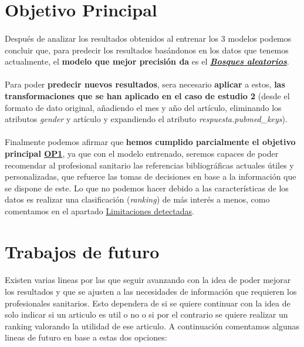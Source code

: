 \section{Objetivo Principal}

\paragraph{}
Después de analizar los resultados obtenidos al entrenar los 3 modelos podemos concluir que, para predecir los resultados basándonos en los datos que tenemos actualmente, el \textbf{modelo que mejor precisión da} es el \hyperref[table:comparative]{\textbf{\textit{Bosques aleatorios}}}.

\paragraph{}
Para poder \textbf{predecir nuevos resultados}, sera necesario \textbf{aplicar} a estos, \textbf{las transformaciones que se han aplicado en el caso de estudio 2} (desde el formato de dato original, añadiendo el mes y año del artículo, eliminando los atributos \textit{gender} y artículo y expandiendo el atributo \textit{respuesta.pubmed\_keys}).

\paragraph{}
Finalmente podemos afirmar que \textbf{hemos cumplido parcialmente el objetivo principal \hyperref[op:OP1]{OP1}}, ya que con el modelo entrenado, seremos capaces de poder recomendar al profesional sanitario las referencias bibliográficas actuales útiles y personalizadas, que refuerce las tomas de decisiones en base a la información que se dispone de este. Lo que no podemos hacer debido a las características de los datos es realizar una clasificación (\textit{ranking}) de más interés a menos, como comentamos en el apartado \hyperref[section:limit]{Limitaciones detectadas}.

\section{Trabajos de futuro}

\paragraph{}
Existen varias lineas por las que seguir avanzando con la idea de poder mejorar los resultados y que se ajusten a las necesidades de información que requieren los profesionales sanitarios. Esto dependera de si se quiere continuar con la idea de solo indicar si un articulo es util o no o si por el contrario se quiere realizar un ranking valorando la utilidad de ese articulo. A continuación comentamos algunas lineas de futuro en base a estas dos opciones:


